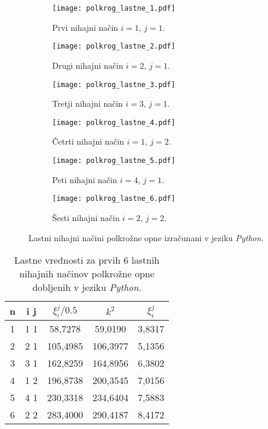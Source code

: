 \documentclass[12pt,a4paper]{article}
\begin{document}
\begin{figure}[H]
    \centering
    \begin{subfigure}[b]{0.45\textwidth}  			
        \texttt{[image: polkrog\_lastne\_1.pdf]}
        \caption{Prvi nihajni način $i=1$, $j=1$.}
    \end{subfigure}
    \begin{subfigure}[b]{0.45\textwidth}  			
        \texttt{[image: polkrog\_lastne\_2.pdf]}
        \caption{Drugi nihajni način $i=2$, $j=1$.}
    \end{subfigure}
    
    \begin{subfigure}[b]{0.45\textwidth}  			
        \texttt{[image: polkrog\_lastne\_3.pdf]}
        \caption{Tretji nihajni način $i=3$, $j=1$.}
    \end{subfigure}
    \begin{subfigure}[b]{0.45\textwidth}  			
        \texttt{[image: polkrog\_lastne\_4.pdf]}
        \caption{Četrti nihajni način $i=1$, $j=2$.}
    \end{subfigure}
    
    \begin{subfigure}[b]{0.45\textwidth}  			
        \texttt{[image: polkrog\_lastne\_5.pdf]}
        \caption{Peti nihajni način $i=4$, $j=1$.}
    \end{subfigure}
    \begin{subfigure}[b]{0.45\textwidth}  			
        \texttt{[image: polkrog\_lastne\_6.pdf]}
        \caption{Šesti nihajni način $i=2$, $j=2$.}
    \end{subfigure}
    \caption{Lastni nihajni načini polkrožne opne izračunani v jeziku \textit{Python}.} \label{fig:slika7}
\end{figure}

\begin{table}[H]
\begin{center}
\begin{tabular}{|c|c|c|c|c|}
\hline
n & i j & $\xi ^{j} _i /0.5$ & $k^{2}$  & $\xi ^{j} _i$ \\ \hline
1 & 1 1 & 58,7278                    & 59,0190  & 3,8317        \\ \hline
2 & 2 1 & 105,4985                   & 106,3977 & 5,1356        \\ \hline
3 & 3 1 & 162,8259                   & 164,8956 & 6,3802        \\ \hline
4 & 1 2 & 196,8738                   & 200,3545 & 7,0156        \\ \hline
5 & 4 1 & 230,3318                   & 234,6404 & 7,5883        \\ \hline
6 & 2 2 & 283,4000                   & 290,4187 & 8,4172        \\ \hline
\end{tabular}
\caption{Lastne vrednosti za prvih 6 lastnih nihajnih načinov polkrožne opne dobljenih v jeziku \textit{Python}.}
\label{table:tabela2}
\end{center}
\end{table}
\end{document}
